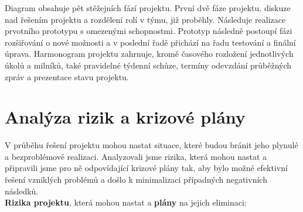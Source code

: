 \documentclass[12pt,a4paper]{article}
\begin{document}
Diagram obsahuje pět stěžejních fází projektu. První dvě fáze projektu, diskuze nad řešením projektu a rozdělení rolí v týmu, již proběhly. Následuje realizace prvotního prototypu s omezenými schopnostmi. Prototyp následně postoupí fázi rozšiřování o nové možnosti a v poslední řadě přichází na řadu testování a finální úprava. Harmonogram projektu zahrnuje, kromě časového rozložení jednotlivých úkolů a milníků, také pravidelné týdenní schůze, termíny odevzdání průběžných zpráv a prezentace stavu projektu.

\section*{Analýza rizik a krizové plány}
V průběhu řešení projektu mohou nastat situace, které budou bránit jeho plynulé a bezproblémové realizaci. Analyzovali jsme rizika, která mohou nastat a připravili jsme pro ně odpovídající krizové plány tak, aby bylo možné efektivní řešení vzniklých problémů a došlo k minimalizaci případných negativních následků. \\

\noindent \textbf{Rizika projektu}, která mohou nastat a \textbf{plány} na jejich eliminaci: 
\end{document}
